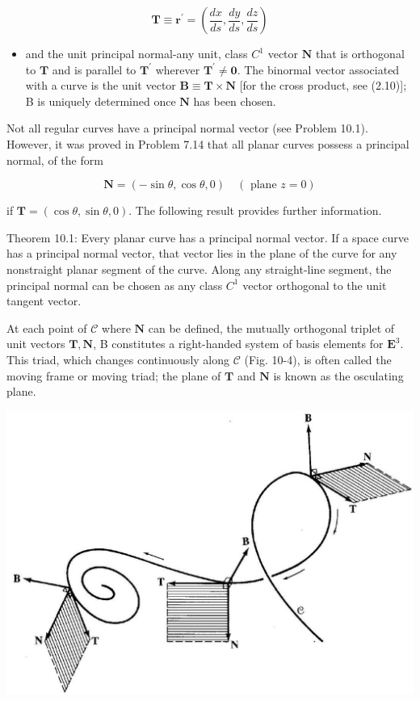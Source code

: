 \documentclass[10pt]{article}
\begin{document}
$$
\mathbf{T} \equiv \mathbf{r}^{\prime}=\left(\frac{d x}{d s}, \frac{d y}{d s}, \frac{d z}{d s}\right)
$$

\begin{itemize}
  \item and the unit principal normal-any unit, class $C^{1}$ vector $\mathbf{N}$ that is orthogonal to $\mathbf{T}$ and is parallel to $\mathbf{T}^{\prime}$ wherever $\mathbf{T}^{\prime} \neq \mathbf{0}$. The binormal vector associated with a curve is the unit vector $\mathbf{B} \equiv \mathbf{T} \times \mathbf{N}$ [for the cross product, see (2.10)]; B is uniquely determined once $\mathbf{N}$ has been chosen.
\end{itemize}

Not all regular curves have a principal normal vector (see Problem 10.1). However, it was proved in Problem 7.14 that all planar curves possess a principal normal, of the form

$$
\mathbf{N}=(-\sin \theta, \cos \theta, 0) \quad(\text { plane } z=0)
$$

if $\mathbf{T}=(\cos \theta, \sin \theta, 0)$. The following result provides further information.

Theorem 10.1: Every planar curve has a principal normal vector. If a space curve has a principal normal vector, that vector lies in the plane of the curve for any nonstraight planar segment of the curve. Along any straight-line segment, the principal normal can be chosen as any class $C^{1}$ vector orthogonal to the unit tangent vector.

At each point of $\mathscr{C}$ where $\mathbf{N}$ can be defined, the mutually orthogonal triplet of unit vectors $\mathbf{T}, \mathbf{N}$, B constitutes a right-handed system of basis elements for $\mathbf{E}^{3}$. This triad, which changes continuously along $\mathscr{C}$ (Fig. 10-4), is often called the moving frame or moving triad; the plane of $\mathbf{T}$ and $\mathbf{N}$ is known as the osculating plane.

\begin{center}
\includegraphics[max width=\textwidth]{2024_04_03_41f90be4f896e21f0dc9g-138}
\end{center}
\end{document}
